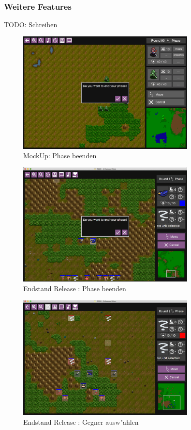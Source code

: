 \documentclass[12pt, titlepage]{scrartcl}
\newcommand{\RN}[1]{%
	\textup{\uppercase\expandafter{\romannumeral#1}}%
}
\begin{document}
			\subsubsection{Weitere Features}
				TODO: Schreiben
				\begin{figure}[H] 
					\centering
					\includegraphics[width=0.8\textwidth]{images/mockUps/EndPhase.png}
					\caption{MockUp: Phase beenden}
					\label{Phase_End_2}
				\end{figure}
				\begin{figure}[H] 
					\centering
					\includegraphics[width=0.8\textwidth]{images/endOfRelease/EndPhase.png}
					\caption{Endstand Release \RN{3}: Phase beenden}
					\label{End_Phase_End}
				\end{figure}
				\begin{figure}[H] 
					\centering
					\includegraphics[width=0.8\textwidth]{images/endOfRelease/SelectEnemy.png}
					\caption{Endstand Release \RN{3}: Gegner ausw"ahlen}
					\label{End_Select_Enemy}
				\end{figure}
\end{document}
